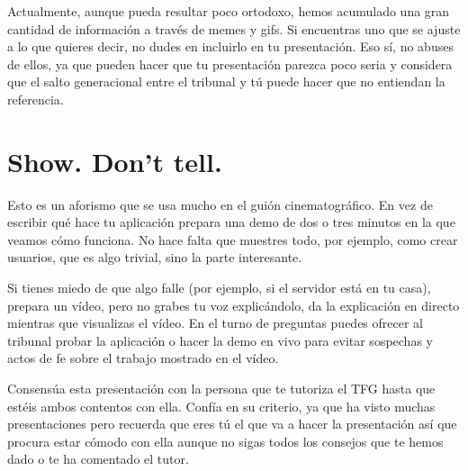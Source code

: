 Actualmente, aunque pueda resultar poco ortodoxo, hemos acumulado una gran cantidad de información a través de memes y gifs. Si encuentras uno que se ajuste a lo que quieres decir, no dudes en incluirlo en tu presentación. Eso sí, no abuses de ellos, ya que pueden hacer que tu presentación parezca poco seria y considera que el salto generacional entre el tribunal y tú puede hacer que no entiendan la referencia. 

\section{Show. Don't tell.}

Esto es un aforismo que se usa mucho en el guión cinematográfico. En vez de escribir qué hace tu aplicación prepara una demo de dos o tres minutos en la que veamos cómo funciona. No hace falta que muestres todo, por ejemplo, como crear usuarios, que es algo trivial, sino la parte interesante.

Si tienes miedo de que algo falle (por ejemplo, si el servidor está en tu casa), prepara un vídeo, pero no grabes tu voz explicándolo, da la explicación en directo mientras que visualizas el vídeo. En el turno de preguntas puedes ofrecer al tribunal probar la aplicación o hacer la demo en vivo para evitar sospechas y actos de fe sobre el trabajo mostrado en el vídeo.

Consensúa esta presentación con la persona que te tutoriza el TFG hasta que estéis ambos contentos con ella. Confía en su criterio, ya que ha visto muchas presentaciones pero recuerda que eres tú el que va a hacer la presentación así que procura estar cómodo con ella aunque no sigas todos los consejos que te hemos dado o te ha comentado el tutor.


